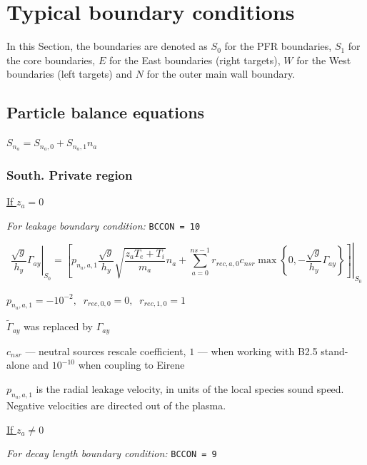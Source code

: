 \documentclass[a4paper,10pt]{report}
\begin{document}
\section{Typical boundary conditions}

In this Section, the boundaries are denoted as $S_0$ for the PFR boundaries, $S_1$ for the core boundaries, $E$ for the East boundaries (right targets), $W$ for the West boundaries (left targets) and $N$ for the outer main wall boundary.

\subsection{Particle balance equations}

$S_{n_a} = S_{n_a,0} + S_{n_a,1} n_a$

\subsubsection{South. Private region}

\underline{If $z_a = 0$}

{\em For leakage boundary condition:} {\tt BCCON = 10}

\begin{equation}
\left. \frac{\sqrt g}{h_y}\Gamma_{ay} \right|_{S_0}
=
\left. \left[
p_{n_a,a,1} \frac{\sqrt g}{h_y} \sqrt{\frac{z_a T_e + T_i}{m_a}} n_a
+
\sum \limits_{a=0}^{ns-1} r_{rec,a,0} c_{nsr}
\max \left\{0, -\frac{\sqrt g}{h_y} \Gamma_{ay} \right\}
\right] \right|_{S_0}
\end{equation}

$p_{n_a,a,1} = -10^{-2}, \;\; r_{rec,0,0} = 0,\;\; r_{rec,1,0} = 1$

$\widetilde{\Gamma}_{ay}$ was replaced by $\Gamma_{ay}$

$c_{nsr}$ --- neutral sources rescale coefficient, $1$ --- when working with B2.5 stand-alone and $10^{-10}$ when coupling to Eirene

$p_{n_a,a,1}$ is the radial leakage velocity, in units of the local species sound speed. Negative velocities are directed out of the plasma.

\underline{If $z_a \neq 0$}

{\em For decay length boundary condition:} {\tt BCCON = 9}
\end{document}
